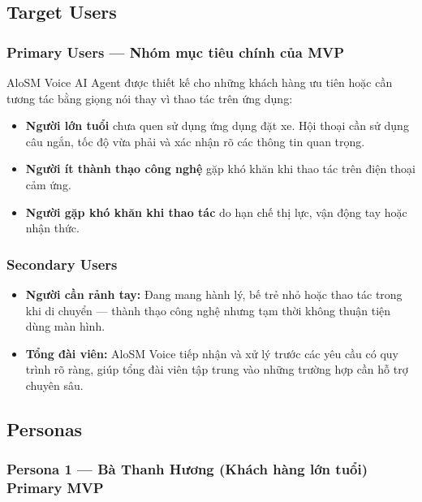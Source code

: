 \documentclass[12pt,a4paper]{article}
\newcommand{\mvptag}{\colorbox{AloLightBlue}{\small\textbf{MVP}}}
\newcommand{\primarytag}{\colorbox{PrioMust}{\small\textbf{Primary}}}
\begin{document}
\subsection{Target Users}

\subsubsection*{Primary Users --- Nhóm mục tiêu chính của MVP}

AloSM Voice AI Agent được thiết kế cho những khách hàng ưu tiên hoặc cần tương tác bằng giọng nói thay vì thao tác trên ứng dụng:

\begin{itemize}
  \item \textbf{Người lớn tuổi} chưa quen sử dụng ứng dụng đặt xe. Hội thoại cần sử dụng câu ngắn, tốc độ vừa phải và xác nhận rõ các thông tin quan trọng.
  \item \textbf{Người ít thành thạo công nghệ} gặp khó khăn khi thao tác trên điện thoại cảm ứng.
  \item \textbf{Người gặp khó khăn khi thao tác} do hạn chế thị lực, vận động tay hoặc nhận thức.
\end{itemize}

\subsubsection*{Secondary Users}

\begin{itemize}
  \item \textbf{Người cần rảnh tay:} Đang mang hành lý, bế trẻ nhỏ hoặc thao tác trong khi di chuyển --- thành thạo công nghệ nhưng tạm thời không thuận tiện dùng màn hình.
  \item \textbf{Tổng đài viên:} AloSM Voice tiếp nhận và xử lý trước các yêu cầu có quy trình rõ ràng, giúp tổng đài viên tập trung vào những trường hợp cần hỗ trợ chuyên sâu.
\end{itemize}

\subsection{Personas}

\subsubsection{Persona 1 --- Bà Thanh Hương (Khách hàng lớn tuổi) \primarytag{} \mvptag{}}
\end{document}
